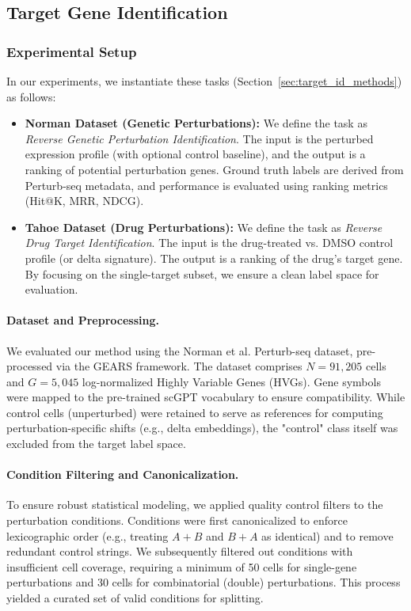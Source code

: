 \documentclass[conference]{IEEEtran}
\begin{document}
\subsection{Target Gene Identification}

\subsubsection{Experimental Setup}

In our experiments, we instantiate these tasks (Section~\ref{sec:target_id_methods}) as follows:
\begin{itemize}
    \item \textbf{Norman Dataset (Genetic Perturbations):} We define the task as \textit{Reverse Genetic Perturbation Identification}. The input is the perturbed expression profile (with optional control baseline), and the output is a ranking of potential perturbation genes. Ground truth labels are derived from Perturb-seq metadata, and performance is evaluated using ranking metrics (Hit@K, MRR, NDCG).
    \item \textbf{Tahoe Dataset (Drug Perturbations):} We define the task as \textit{Reverse Drug Target Identification}. The input is the drug-treated vs. DMSO control profile (or delta signature). The output is a ranking of the drug's target gene. By focusing on the single-target subset, we ensure a clean label space for evaluation.
\end{itemize}

\paragraph{Dataset and Preprocessing.}
We evaluated our method using the Norman et al. Perturb-seq dataset, pre-processed via the GEARS framework. The dataset comprises $N=91,205$ cells and $G=5,045$ log-normalized Highly Variable Genes (HVGs). Gene symbols were mapped to the pre-trained scGPT vocabulary to ensure compatibility. While control cells (unperturbed) were retained to serve as references for computing perturbation-specific shifts (e.g., delta embeddings), the "control" class itself was excluded from the target label space.

\paragraph{Condition Filtering and Canonicalization.}
To ensure robust statistical modeling, we applied quality control filters to the perturbation conditions. Conditions were first canonicalized to enforce lexicographic order (e.g., treating $A+B$ and $B+A$ as identical) and to remove redundant control strings. We subsequently filtered out conditions with insufficient cell coverage, requiring a minimum of 50 cells for single-gene perturbations and 30 cells for combinatorial (double) perturbations. This process yielded a curated set of valid conditions for splitting.
\end{document}
